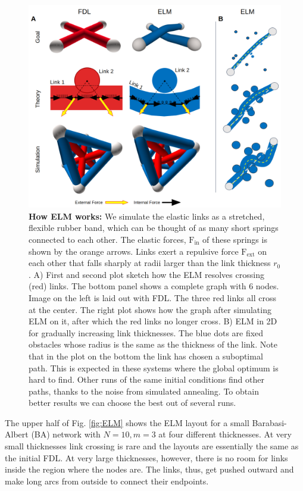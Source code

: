 \documentclass[nofootinbib,preprint,floatfix,endfloats]{revtex4} %
\begin{document}
\begin{figure}
    \centering
    \includegraphics[width = .8\columnwidth]{fig-09-19/elf-resolve-2d.png}%
    \caption{{\bf How ELM works:} We simulate the elastic links as a stretched, flexible rubber band, which can be thought of as many short springs connected to each other. The elastic forces, $\mathrm{F}_{\mathrm{in}}$ of these springs is shown by the orange arrows. Links exert a repulsive force $\mathrm{F}_{\mathrm{ext}}$  on each other that falls sharply at radii larger than the link thickness $r_0$. 
    A) First and second plot sketch how the ELM resolves crossing (red) links. The bottom panel shows a complete graph with 6 nodes. Image on the left is laid out with FDL. The three red links all cross at the center. The right plot shows how the graph after simulating ELM on it, after which the red links no longer cross. B) ELM in 2D for gradually increasing link thicknesses. The blue dots are fixed obstacles whose radius is the same as the thickness of the link. Note that in the plot on the bottom the link has chosen a suboptimal path. This is  expected in these systems where the global optimum is hard to find. Other runs of the same initial conditions find other paths, thanks to the noise from simulated annealing. To obtain better results we can choose the best out of several runs.}
    \label{fig:resolve}
\end{figure}
%
The upper half of Fig. \ref{fig:ELM} shows the ELM layout for a small Barabasi-Albert (BA) network with $N=10, m=3$ at four different thicknesses. At very small thicknesses link crossing is rare and the layouts are essentially the same as the initial FDL. At very large thicknesses, however, there is no room for links inside the region where the nodes are. The links, thus, get pushed outward and make long arcs from outside to connect their endpoints.
\end{document}
